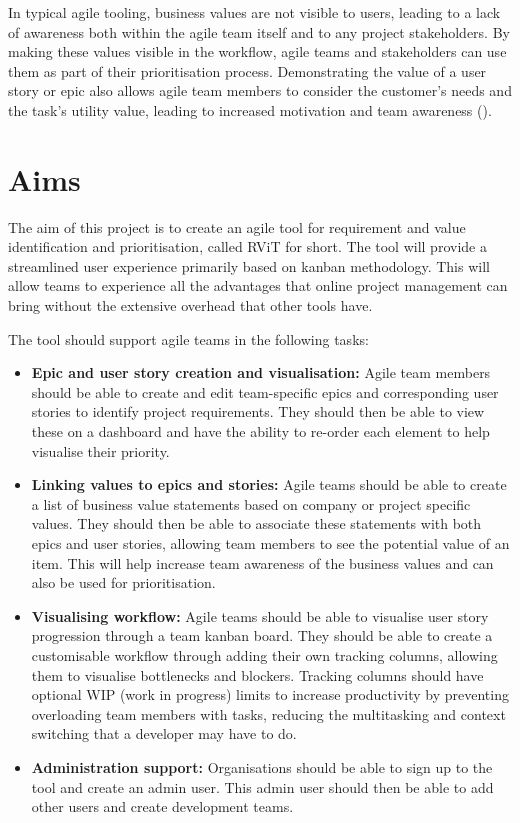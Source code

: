 \documentclass[l4proj.tex]{subfiles}
\begin{document}
In typical agile tooling, business values are not visible to users, leading to a lack of awareness both within the agile team itself and to any project stakeholders. By making these values visible in the workflow, agile teams and stakeholders can use them as part of their prioritisation process. Demonstrating the value of a user story or epic also allows agile team members to consider the customer's needs and the task's utility value, leading to increased motivation and team awareness (\cite{Wigfield2000}).


\section{Aims}
The aim of this project is to create an agile tool for requirement and value identification and prioritisation, called RViT for short. The tool will provide a streamlined user experience primarily based on kanban methodology. This will allow teams to experience all the advantages that online project management can bring without the extensive overhead that other tools have.

The tool should support agile teams in the following tasks: 
\begin{itemize}
    \item \textbf{Epic and user story creation and visualisation:}
    Agile team members should be able to create and edit team-specific epics and corresponding user stories to identify project requirements. They should then be able to view these on a dashboard and have the ability to re-order each element to help visualise their priority.
    \item \textbf{Linking values to epics and stories:}
    Agile teams should be able to create a list of business value statements based on company or project specific values. They should then be able to associate these statements with both epics and user stories, allowing team members to see the potential value of an item. This will help increase team awareness of the business values and can also be used for prioritisation.
    \item \textbf{Visualising workflow:}
    Agile teams should be able to visualise user story progression through a team kanban board. They should be able to create a customisable workflow through adding their own tracking columns, allowing them to visualise bottlenecks and blockers. Tracking columns should have optional WIP (work in progress) limits to increase productivity by preventing overloading team members with tasks, reducing the multitasking and context switching that a developer may have to do. 
    \item \textbf{Administration support:}
    Organisations should be able to sign up to the tool and create an admin user. This admin user should then be able to add other users and create development teams.
\end{itemize}
\end{document}
